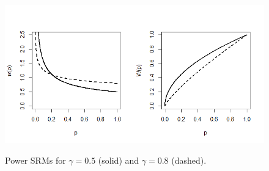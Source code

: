 \begin{figure}
	\begin{center}
		\includegraphics[scale = 0.7]{Figures/Fig2-1.png}\\
	\end{center}
	\caption{Power SRMs for $\gamma=0.5$ (solid) and $\gamma=0.8$ (dashed).}\label{Fig2:PSRM}
\end{figure}		
